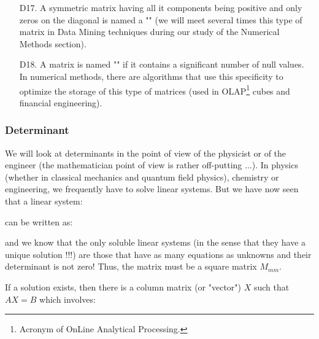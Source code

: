 \begin{enumerate}
		\item[D17.] A symmetric matrix having all it components being positive and only zeros on the diagonal is named a "" (we will meet several times this type of matrix in Data Mining techniques during our study of the Numerical Methods section).
		
		\item[D18.] A matrix is named "" if it contains a significant number of null values. In numerical methods, there are algorithms that use this specificity to optimize the storage of this type of matrices (used in OLAP\footnote{Acronym of OnLine Analytical Processing.} cubes and financial engineering).
	\end{enumerate}
	
	\subsubsection{Determinant}\label{determinant}
	We will look at determinants in the point of view of the physicist or of the engineer (the mathematician point of view is rather off-putting ...). In physics (whether in classical mechanics and quantum field physics), chemistry or engineering, we frequently have to solve linear systems. But we have now seen that a linear system:
	
	can be written as:
	
	and we know that the only soluble linear systems (in the sense that they have a unique solution !!!) are those that have as many equations as unknowns and their determinant is not zero! Thus, the matrix must be a square matrix $M_{mm}$.
	
	If a solution exists, then there is a column matrix (or "vector") $X$ such that $AX=B$ which involves:
	
